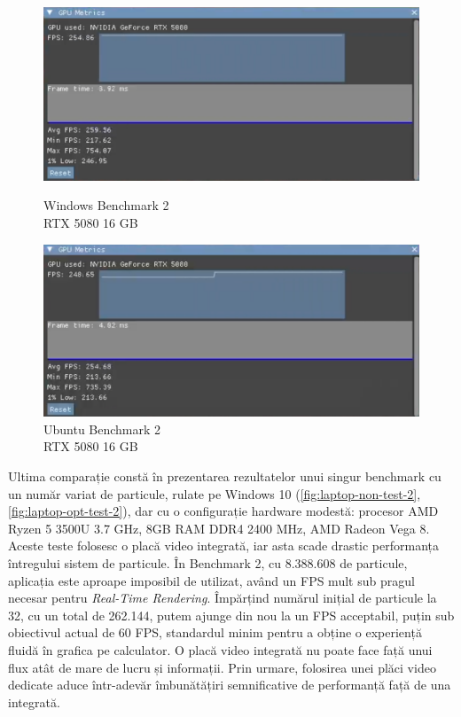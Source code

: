 \begin{figure}[ht]
    \centering
    \begin{minipage}[b]{0.48\textwidth}
        \centering
        \includegraphics[width=\textwidth]{images/5080-windows-2.png}
        \caption{Windows Benchmark 2 \\ \hspace*{6em} RTX 5080 16 GB}
        \label{fig:5080-windows-test-2}
    \end{minipage}
    \hfill
    \begin{minipage}[b]{0.48\textwidth}
        \centering
        \includegraphics[width=\textwidth]{images/5080-linux-2.png}
        \caption{Ubuntu Benchmark 2 \\ \hspace*{6em} RTX 5080 16 GB}
        \label{fig:5080-linux-test-2}
    \end{minipage}
\end{figure}

Ultima comparație constă în prezentarea rezultatelor unui singur benchmark cu un număr variat de particule, rulate pe Windows 10 (\autoref{fig:laptop-non-test-2}, \autoref{fig:laptop-opt-test-2}), dar cu o configurație hardware modestă: procesor AMD Ryzen 5 3500U 3.7 GHz, 8GB RAM DDR4 2400 MHz, AMD Radeon Vega 8. Aceste teste folosesc o placă video integrată, iar asta scade drastic performanța întregului sistem de particule. În Benchmark 2, cu 8.388.608 de particule, aplicația este aproape imposibil de utilizat, având un FPS mult sub pragul necesar pentru \textit{Real-Time Rendering}. Împărțind numărul inițial de particule la 32, cu un total de 262.144, putem ajunge din nou la un FPS acceptabil, puțin sub obiectivul actual de 60 FPS, standardul minim pentru a obține o experiență fluidă în grafica pe calculator. O placă video integrată nu poate face față unui flux atât de mare de lucru și informații. Prin urmare, folosirea unei plăci video dedicate aduce într-adevăr îmbunătățiri semnificative de performanță față de una integrată. 

